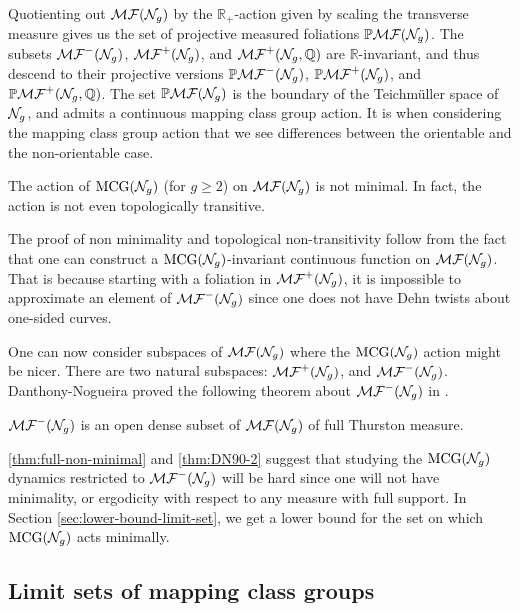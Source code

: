 \documentclass[12pt, reqno]{amsart}
\begin{document}
Quotienting out $\mathcal{MF}(\mathcal{N}_g)$ by the $\mathbb{R_+}$-action given by scaling the transverse measure gives us the set of projective measured foliations $\mathbb{P}\mathcal{MF}(\mathcal{N}_g)$.
The subsets $\mathcal{MF}^-(\mathcal{N}_g)$, $\mathcal{MF}^+(\mathcal{N}_g)$, and $\mathcal{MF}^+(\mathcal{N}_g, \mathbb{Q})$ are $\mathbb{R}$-invariant, and thus descend to their projective versions $\mathbb{P}\mathcal{MF}^-(\mathcal{N}_g)$, $\mathbb{P}\mathcal{MF}^+(\mathcal{N}_g)$, and $\mathbb{P}\mathcal{MF}^+(\mathcal{N}_g, \mathbb{Q})$.
The set $\mathbb{P}\mathcal{MF}(\mathcal{N}_g)$ is the boundary of the Teichm\"uller space of $\mathcal{N}_g$, and admits a continuous mapping class group action.
It is when considering the mapping class group action that we see differences between the orientable and the non-orientable case.

\begin{theorem}
  \label{thm:full-non-minimal}
  The action of $\mathrm{MCG}(\mathcal{N}_g)$ (for $g \geq 2$) on $\mathcal{MF}(\mathcal{N}_g)$ is not minimal.
  In fact, the action is not even topologically transitive.
\end{theorem}
\begin{remark}
  The proof of non minimality and topological non-transitivity follow from the fact that one can construct a $\mathrm{MCG}(\mathcal{N}_g)$-invariant continuous function on $\mathcal{MF}(\mathcal{N}_g)$.
  That is because starting with a foliation in $\mathcal{MF}^+(\mathcal{N}_g)$, it is impossible to approximate an element of $\mathcal{MF}^-(\mathcal{N}_g)$ since one does not have Dehn twists about one-sided curves.
\end{remark}

One can now consider subspaces of $\mathcal{MF}(\mathcal{N}_g)$ where the $\mathrm{MCG}(\mathcal{N}_g)$ action might be nicer. There are two natural subspaces: $\mathcal{MF}^+(\mathcal{N}_g)$, and $\mathcal{MF}^{-}(\mathcal{N}_g)$.
Danthony-Nogueira proved the following theorem about $\mathcal{MF}^{-}(\mathcal{N}_g)$ in \cite{ASENS_1990_4_23_3_469_0}.

\begin{theorem}
  \label{thm:DN90-2}
  $\mathcal{MF}^{-}(\mathcal{N}_g)$ is an open dense subset of $\mathcal{MF}(\mathcal{N}_g)$ of full Thurston measure.
\end{theorem}

\autoref{thm:full-non-minimal} and \autoref{thm:DN90-2} suggest that studying the $\mathrm{MCG}(\mathcal{N}_g)$ dynamics restricted to $\mathcal{MF}^{-}(\mathcal{N}_g)$ will be hard since one will not have minimality, or ergodicity with respect to any measure with full support.
In Section \ref{sec:lower-bound-limit-set}, we get a lower bound for the set on which $\mathrm{MCG}(\mathcal{N}_g)$ acts minimally.

\subsection{Limit sets of mapping class groups}
\label{sec:backgr-limit-sets}
\end{document}
